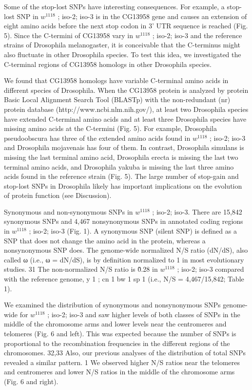 Some of the stop-lost SNPs have interesting consequences. For example, a stop-lost SNP in $w^{1118}$ ; iso-2; iso-3 is in the CG13958 gene and causes an extension of eight amino acids before the next stop codon in 3' UTR sequence is reached (Fig. 5). Since the C-termini of CG13958 vary in $w^{1118}$ ; iso-2; iso-3 and the reference strains of Drosophila melanogaster, it is conceivable that the C-terminus might also fluctuate in other Drosophila species. To test this idea, we investigated the C-terminal regions of CG13958 homologs in other Drosophila species.

We found that CG13958 homologs have variable C-terminal amino acids in different species of Drosophila. When the CG13958 protein is analyzed by protein Basic Local Alignment Search Tool (BLASTp) with the non-redundant (nr) protein database (http://www.ncbi.nlm.nih.gov/), at least two Drosophila species have extended C-terminal amino acids and at least three Drosophila species have missing amino acids at the C-termini (Fig. 5). For example, Drosophila pseudoobscura has three of the extended amino acids found in $w^{1118}$ ; iso-2; iso-3 and Drosophila mojavenais has four of them. In contrast, Drosophila simulans is missing the last terminal amino acid, Drosophila erecta is missing the last two terminal amino acids, and Drosophila yakuba is missing the last three amino acids found in the reference strain (Fig. 5). The large number of stop-gain and stop-lost SNPs in Drosophila likely has important implications on the evolution of protein function (see Discussion).

Synonymous and non-synonymous SNPs in $w^{1118}$ ; iso-2; iso-3. There are 15,842 synonymous SNPs and 4,467 nonsynonymous SNPs in annotated coding regions in $w^{1118}$ ; iso-2; iso-3 (Fig. 1). A synonymous SNP (silent SNP) is defined as a SNP that does not change the amino acid in the protein, whereas a nonsynonymous SNP does. The genome-wide normalized N/S ratio (dN/dS), also called ω (i.e., ω = dN/dS), is by definition normalized to 1 in most evolutionary studies. 31 The non-normalized N/S ratio is \~0.28 in $w^{1118}$ ; iso-2; iso-3 compared with the reference genome, y 1 ; cn 1 bw 1 sp 1 (i.e., N/S = 4,467/15,842; Table 1).

We examined the distribution of synonymous and nonsynonymous SNPs genome-wide for $w^{1118}$ ; iso-2; iso-3 and saw higher levels of both classes of SNPs in the middle of the chromosome arms and lower levels near the centromeres and telomeres (Fig.  6 and left). This was expected because the number of SNPs is proportional to the recombination frequencies in the different regions of the chromosomes. 32,33 Also, our previous analyses of the distribution of total SNPs revealed a similar pattern. 1 We observed higher N/S ratios near the telomeres and centromeres and lower N/S ratios in the middle of the chromosome arms (Fig.  6 and right).

